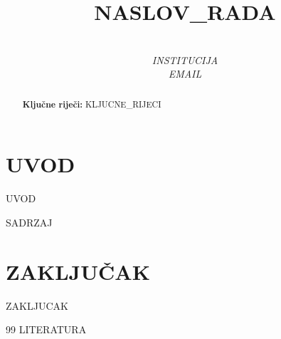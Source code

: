 \documentclass[10pt,a4paper,twocolumn]{article}
\title{%
    \vspace{-1.5cm}%
    {\fontsize{16pt}{19pt}\selectfont\bfseries\uppercase{{{NASLOV_RADA}}}}%
    \vspace{0.3cm}%
}
\author{%
    {\fontsize{12pt}{14pt}\selectfont {{IME_I_PREZIME}}}\\[2pt]
    {\small\textit{{{INSTITUCIJA}}}}\\[2pt]
    {\small\textit{{{EMAIL}}}}%
}
\date{}
\begin{document}
\maketitle
\thispagestyle{fancy}

\begin{abstract}

\vspace{0.3cm}
\noindent \textbf{Ključne riječi:} {{KLJUCNE_RIJECI}}
\end{abstract}

\vspace{0.5cm}


\section{UVOD}
{{UVOD}}

{{SADRZAJ}}

\section{ZAKLJUČAK}
{{ZAKLJUCAK}}

\begin{thebibliography}{99}
{{LITERATURA}}
\end{thebibliography}
\end{document}
